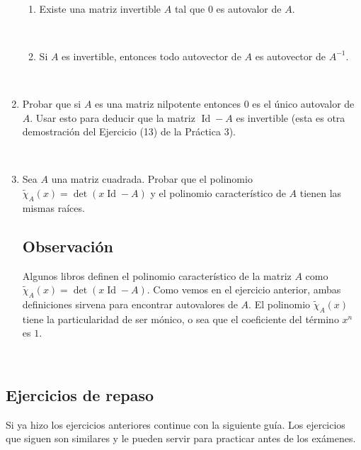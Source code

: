 \documentclass[12pt]{amsart}
\begin{document}
\begin{enumerate}
\

\begin{enumerate}
\item Existe una matriz invertible $A$ tal que $0$ es autovalor de $A$.

\

\item  Si $A$ es invertible, entonces todo autovector de $A$ es autovector de $A^{-1}$.

\end{enumerate}

\

\item Probar que si $A$ es una matriz nilpotente entonces $0$ es el \' unico autovalor de $A$. Usar esto para deducir que la matriz $\operatorname{Id}-A$ es invertible (esta es otra demostraci\'on del Ejercicio (13) de la Pr\'actica 3). 

\

\item Sea $A$ una matriz cuadrada. Probar que el polinomio $\tilde\chi_A(x)=\det(x\operatorname{Id}-A)$ y el polinomio caracter\'istico de $A$ tienen las mismas ra\'ices.

\subsection*{Observaci\'{o}n} Algunos libros definen el polinomio caracter\'istico de la matriz $A$ como $\tilde\chi_A(x)=\det(x\operatorname{Id}-A)$. Como vemos en el ejercicio anterior, ambas definiciones sirvena para encontrar autovalores de $A$. El polinomio $\tilde\chi_A(x)$ tiene la particularidad de ser m\'onico, o sea que el coeficiente del t\'ermino $x^n$ es $1$.

\end{enumerate}

\

\subsection*{Ejercicios de repaso}
Si ya hizo los ejercicios anteriores continue con la siguiente gu\'ia. Los ejercicios que siguen son similares y le pueden servir para practicar antes de los ex\'amenes.

\
\end{document}
